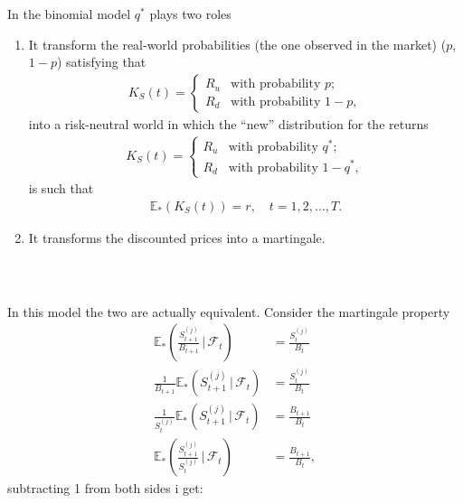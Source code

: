 \documentclass{beamer}
\numberwithin{equation}{section}
\begin{document}
\begin{frame}\frametitle{{\normalsize \secname} \\ {\large \subsecname}}
    In the binomial model $q^*$ plays two roles
    \begin{enumerate}
        \item It transform the real-world probabilities (the one observed in the market) ($p$, $1-p$) satisfying that
        \begin{align}
            K_S(t) =
            \begin{cases}
                R_u & \text{with probability } p; \\
                R_d & \text{with probability } 1 - p,
            \end{cases}
        \end{align}
        into a risk-neutral world in which the ``new'' distribution for the returns
        \begin{align}
            K_S(t) =
            \begin{cases}
                R_u & \text{with probability } q^*; \\
                R_d & \text{with probability } 1 - q^*,
            \end{cases}
        \end{align}
        is such that
        \begin{align}
            \mathbb{E}_*(K_S(t)) = r, \quad t = 1,2,\ldots,T.
        \end{align}
        \item It transforms the discounted prices into a martingale.
    \end{enumerate}
\end{frame}

\begin{frame}\frametitle{{\normalsize \secname} \\ {\large \subsecname}}
    In this model the two are actually equivalent.
    Consider the martingale property
    \begin{align}
        \mathbb{E}_*\left( \frac{S_{t + 1}^{(j)}}{B_{t + 1}} \, \bigg| \, \mathscr{F}_t \right) &= \frac{S_{t}^{(j)}}{B_{t}} \\
        \frac{1}{B_{t + 1}}\mathbb{E}_*\left( S_{t + 1}^{(j)} \, \bigg| \, \mathscr{F}_t \right) &= \frac{S_{t}^{(j)}}{B_{t}} \\
        \frac{1}{S_{t}^{(j)}}\mathbb{E}_*\left( S_{t + 1}^{(j)} \, \bigg| \, \mathscr{F}_t \right) &= \frac{B_{t + 1}}{B_{t}} \\
        \mathbb{E}_*\left( \frac{S_{t + 1}^{(j)}}{S_{t}^{(j)}} \, \bigg| \, \mathscr{F}_t \right) &= \frac{B_{t + 1}}{B_{t}},
    \end{align}
    subtracting 1 from both sides i get:
\end{frame}
\end{document}
